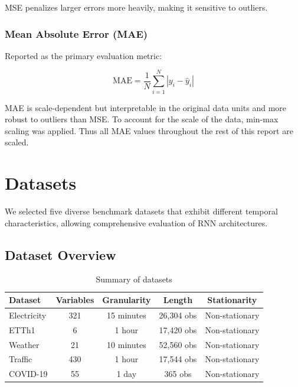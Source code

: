 \documentclass[conference]{IEEEtran}
\begin{document}
MSE penalizes larger errors more heavily, making it sensitive to
outliers.

\subsubsection{Mean Absolute Error (MAE)}

Reported as the primary evaluation metric:

\begin{equation}
\text{MAE} =
\frac{1}{N}\sum_{i=1}^{N}|y_i - \hat{y}_i|
\end{equation}

MAE is scale-dependent but interpretable in the original data units
and more robust to outliers than MSE. To account for the scale of the
data, min-max scaling was applied. Thus all MAE values throughout
the rest of this report are scaled.

\section{Datasets}
\label{sec:datasets}

We selected five diverse benchmark datasets that exhibit different temporal characteristics, allowing comprehensive evaluation of RNN architectures.

\subsection{Dataset Overview}

\begin{table}[H]
\centering
\caption{Summary of datasets}
\label{tab:datasets}
\begin{tabular}{lcccc}
\toprule
\textbf{Dataset} & \textbf{Variables} & \textbf{Granularity} &
\textbf{Length} & \textbf{Stationarity} \\
\midrule
Electricity & 321 & 15 minutes & 26,304 obs & Non-stationary \\
ETTh1 & 6 & 1 hour & 17,420 obs & Non-stationary \\
Weather & 21 & 10 minutes & 52,560 obs & Non-stationary \\
Traffic & 430 & 1 hour & 17,544 obs & Non-stationary \\
COVID-19 & 55 & 1 day & 365 obs & Non-stationary \\
\bottomrule
\end{tabular}
\end{table}
\end{document}

